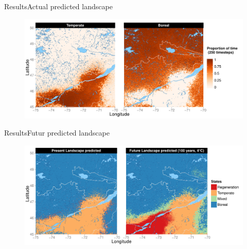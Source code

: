 \documentclass[10pt,aspectratio=149]{beamer}
\begin{document}

\begin{frame}[t]{Results}{Actual predicted landscape}

		\begin{figure}
			\vspace{-1em}
			\includegraphics[height=0.65\paperheight]{Figs/TimeState.pdf}
		\end{figure}


\end{frame}


\begin{frame}[t]{Results}{Futur predicted landscape}

		\begin{figure}
			\vspace{-1em}
			\includegraphics[height=0.65\paperheight]{Figs/LastFrameSimus.pdf}
		\end{figure}

\end{frame}


\end{document}
